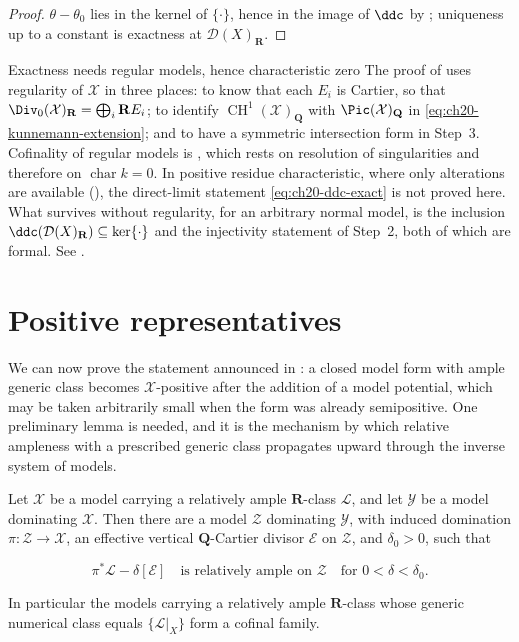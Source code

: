 \begin{proof}
\(\theta-\theta_0\) lies in the kernel of \(\{\cdot\}\), hence in the image
of \(\ddc\) by ; uniqueness up to a constant is
exactness at \(\mathcal D(X)_{\mathbf R}\).
\end{proof}

\begin{warning}{Exactness needs regular models, hence characteristic zero}
The proof of  uses regularity of \(\mathcal X\) in
three places: to know that each \(E_i\) is Cartier, so that
\(\Div_0(\mathcal X)_{\mathbf R}=\bigoplus_i\mathbf R E_i\); to identify
\(\operatorname{CH}^1(\mathcal X)_{\mathbf Q}\) with
\(\Pic(\mathcal X)_{\mathbf Q}\) in
\eqref{eq:ch20-kunnemann-extension}; and to have a symmetric intersection
form in Step~3.  Cofinality of regular models is
, which rests on resolution of singularities and
therefore on \(\operatorname{char}k=0\).  In positive residue
characteristic, where only alterations are available
(), the direct-limit statement
\eqref{eq:ch20-ddc-exact} is not proved here.  What survives without
regularity, for an arbitrary normal model, is the inclusion
\(\ddc(\mathcal D(X)_{\mathbf R})\subseteq\ker\{\cdot\}\) and the injectivity
statement of Step~2, both of which are formal.  See
.
\end{warning}

\section{Positive representatives}
\label{sec:ch20-positive-representative}

We can now prove the statement announced in
: a closed model form with ample generic
class becomes \(\mathcal X\)-positive after the addition of a model
potential, which may be taken arbitrarily small when the form was already
semipositive.  One preliminary lemma is needed, and it is the mechanism by
which relative ampleness with a prescribed generic class propagates upward
through the inverse system of models.

\begin{lemma}
\label{lem:ch20-ample-propagation}
Let \(\mathcal X\) be a model carrying a relatively ample
\(\mathbf R\)-class \(\mathcal L\), and let \(\mathcal Y\) be a model
dominating \(\mathcal X\).  Then there are a model \(\mathcal Z\) dominating
\(\mathcal Y\), with induced domination \(\pi:\mathcal Z\to\mathcal X\), an
effective vertical \(\mathbf Q\)-Cartier divisor \(\mathcal E\) on
\(\mathcal Z\), and \(\delta_0>0\), such that

\begin{equation}
\label{eq:ch20-ample-propagation}
 \pi^*\mathcal L-\delta[\mathcal E]
 \quad\text{is relatively ample on }\mathcal Z
 \quad\text{for }0<\delta<\delta_0 .
\end{equation}

In particular the models carrying a relatively ample \(\mathbf R\)-class
whose generic numerical class equals \(\{\mathcal L|_X\}\) form a cofinal
family.
\end{lemma}

